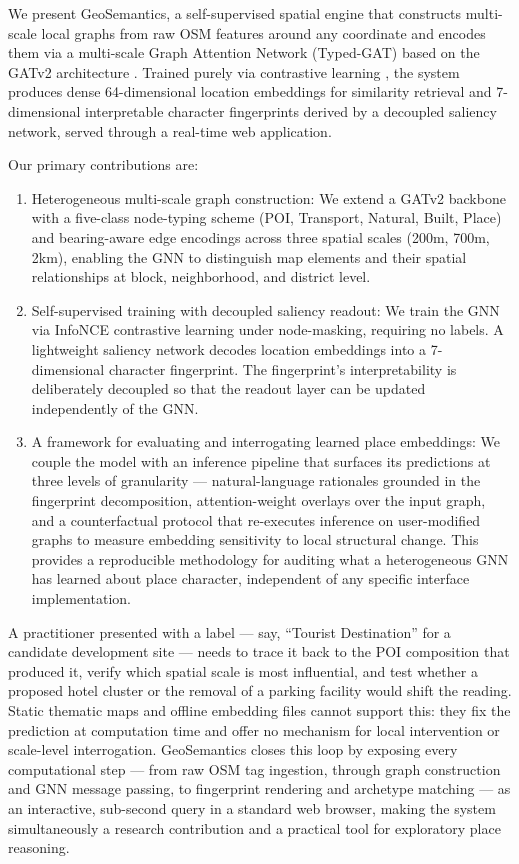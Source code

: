 \documentclass[]{interact}
\theoremstyle{plain}%
\theoremstyle{definition}
\theoremstyle{remark}
\begin{document}
We present GeoSemantics, a self-supervised spatial engine that constructs multi-scale local graphs from raw OSM features around any coordinate and encodes them via a multi-scale Graph Attention Network (Typed-GAT) based on the GATv2 architecture \citep{brody2022attentivegraphattentionnetworks}. Trained purely via contrastive learning \citep{DBLP:journals/corr/abs-1807-03748}, the system produces dense 64-dimensional location embeddings for similarity retrieval and 7-dimensional interpretable character fingerprints derived by a decoupled saliency network, served through a real-time web application.

Our primary contributions are:
\begin{enumerate}
\item {Heterogeneous multi-scale graph construction}: We extend a GATv2 backbone \citep{brody2022attentivegraphattentionnetworks} with a five-class node-typing scheme (POI, Transport, Natural, Built, Place) and bearing-aware edge encodings across three spatial scales (200m, 700m, 2km), enabling the GNN to distinguish map elements and their spatial relationships at block, neighborhood, and district level.
\item {Self-supervised training with decoupled saliency readout}: We train the GNN via InfoNCE contrastive learning under node-masking, requiring no labels. A lightweight saliency network decodes location embeddings into a 7-dimensional character fingerprint. The fingerprint's interpretability is deliberately decoupled so that the readout layer can be updated independently of the GNN.
\item {A framework for evaluating and interrogating learned place embeddings}: We couple the model with an inference pipeline that surfaces its predictions at three levels of granularity --- natural-language rationales grounded in the fingerprint decomposition, attention-weight overlays over the input graph, and a counterfactual protocol that re-executes inference on user-modified graphs to measure embedding sensitivity to local structural change. This provides a reproducible methodology for auditing what a heterogeneous GNN has learned about place character, independent of any specific interface implementation.
\end{enumerate}

A practitioner presented with a label — say, ``Tourist Destination'' for a candidate development site — needs to trace it back to the POI composition that produced it, verify which spatial scale is most influential, and test whether a proposed hotel cluster or the removal of a parking facility would shift the reading. Static thematic maps and offline embedding files cannot support this: they fix the prediction at computation time and offer no mechanism for local intervention or scale-level interrogation. GeoSemantics closes this loop by exposing every computational step --- from raw OSM tag ingestion, through graph construction and GNN message passing, to fingerprint rendering and archetype matching --- as an interactive, sub-second query in a standard web browser, making the system simultaneously a research contribution and a practical tool for exploratory place reasoning.
\end{document}
